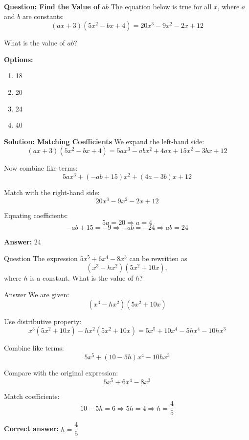 \documentclass{beamer}
\begin{document}
\begin{frame}{\textbf{Question: Find the Value of } \( ab \)}
The equation below is true for all \( x \), where \( a \) and \( b \) are constants:
\[
(ax + 3)(5x^2 - bx + 4) = 20x^3 - 9x^2 - 2x + 12
\]

What is the value of \( ab \)?

\textbf{Options:}
\begin{enumerate}
    \item[A.] 18
    \item[B.] 20
    \item[C.] 24
    \item[D.] 40
\end{enumerate}
\end{frame}


\begin{frame}{\textbf{Solution: Matching Coefficients}}
We expand the left-hand side:
\[
(ax + 3)(5x^2 - bx + 4)= 5a x^3 - ab x^2 + 4a x + 15x^2 - 3b x + 12
\]

Now combine like terms:
\[
5a x^3 + (-ab + 15)x^2 + (4a - 3b)x + 12
\]

Match with the right-hand side:
\[
20x^3 - 9x^2 - 2x + 12
\]

Equating coefficients:
\[
5a = 20 \Rightarrow a = 4
\]
\[
-ab + 15 = -9 \Rightarrow -ab = -24 \Rightarrow ab = 24
\]

\textbf{Answer:} \(\boxed{24}\)
\end{frame}

\begin{frame}{Question}
The expression $5x^5 + 6x^4 - 8x^3$ can be rewritten as 
\[
(x^3 - hx^2)(5x^2 + 10x),
\]
where $h$ is a constant. What is the value of $h$?
\end{frame}

\begin{frame}{Answer}
We are given:
\[
(x^3 - hx^2)(5x^2 + 10x)
\]

Use distributive property:
\[
x^3(5x^2 + 10x) - hx^2(5x^2 + 10x) = 5x^5 + 10x^4 - 5h x^4 - 10h x^3
\]

Combine like terms:
\[
5x^5 + (10 - 5h)x^4 - 10h x^3
\]

Compare with the original expression:
\[
5x^5 + 6x^4 - 8x^3
\]

Match coefficients:
\[
10 - 5h = 6 \Rightarrow 5h = 4 \Rightarrow h = \frac{4}{5}
\]

\textbf{Correct answer:} $h = \dfrac{4}{5}$
\end{frame}
\end{document}
